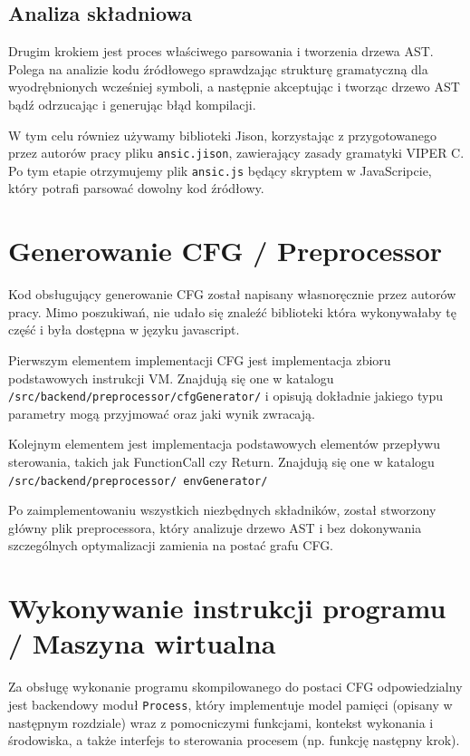 \documentclass[a4paper,twoside,openright,11pt]{report}
\begin{document}
  \subsection {Analiza składniowa}
\par Drugim krokiem jest proces właściwego parsowania i tworzenia drzewa AST. Polega na analizie kodu źródłowego sprawdzając strukturę gramatyczną dla wyodrębnionych wcześniej symboli, a następnie akceptując i tworząc drzewo AST bądź odrzucając i generując błąd kompilacji. \cite{ansk} 
\par W tym celu równiez używamy biblioteki Jison, korzystając z przygotowanego przez autorów pracy pliku \texttt{ansic.jison}, zawierający zasady gramatyki VIPER C. Po tym etapie otrzymujemy plik \texttt{ansic.js} będący skryptem w JavaScripcie, który potrafi parsować dowolny kod źródłowy.

  \section {Generowanie CFG / Preprocessor}
	\par Kod obsługujący generowanie CFG został napisany własnoręcznie przez autorów pracy. Mimo poszukiwań, nie udało się znaleźć biblioteki która wykonywałaby tę część i była dostępna w języku javascript.
	\par Pierwszym elementem implementacji CFG jest implementacja zbioru podstawowych instrukcji VM. Znajdują się one w katalogu \texttt{/src/backend/preprocessor/cfgGenerator/} i opisują dokładnie jakiego typu parametry mogą przyjmować oraz jaki wynik zwracają. 
	\par Kolejnym elementem jest implementacja podstawowych elementów przepływu sterowania, takich jak FunctionCall czy Return. Znajdują się one w katalogu \texttt{/src/backend/preprocessor/ envGenerator/}
	\par Po zaimplementowaniu wszystkich niezbędnych składników, został stworzony główny plik preprocessora, który analizuje drzewo AST i bez dokonywania szczególnych optymalizacji zamienia na postać grafu CFG.
	  
  \section {Wykonywanie instrukcji programu / Maszyna wirtualna}
 	\par Za obsługę wykonanie programu skompilowanego do postaci CFG odpowiedzialny jest backendowy moduł \texttt{Process}, który implementuje model pamięci (opisany w następnym rozdziale) wraz z pomocniczymi funkcjami, kontekst wykonania i środowiska, a także interfejs to sterowania procesem (np. funkcję następny krok).
\end{document}
